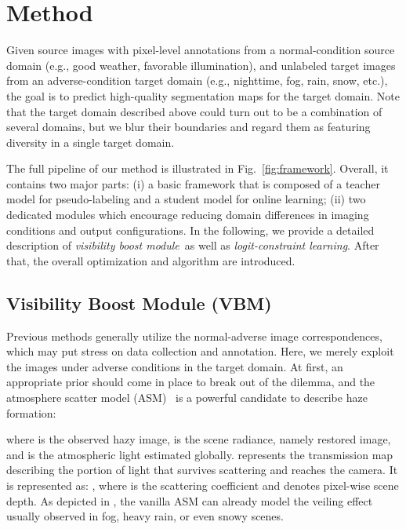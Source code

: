 \documentclass[letterpaper]{article} \usepackage{aaai23}  \usepackage{times}  \usepackage{helvet}  \usepackage{courier}  \usepackage[hyphens]{url}  \usepackage{graphicx} \urlstyle{rm} \def\UrlFont{\rm}  \usepackage{natbib}  \usepackage{caption} \frenchspacing  \setlength{\pdfpagewidth}{8.5in}  \setlength{\pdfpageheight}{11in}  \usepackage{algorithm}
\newcommand{\boostModuleNameTitle}{Visibility Boost Module (VBM)}
\newcommand{\boostModuleName}{\textit{visibility boost module}}
\newcommand{\lossModuleName}{\textit{logit-constraint learning}}
\begin{document}
\section{Method}\label{sec:method}

Given source images with pixel-level annotations from a normal-condition source domain  (e.g., good weather, favorable illumination), and unlabeled target images from an adverse-condition target domain  (e.g., nighttime, fog, rain, snow, etc.), the goal is to predict high-quality segmentation maps for the target domain. Note that the target domain described above could turn out to be a combination of several domains, but we blur their boundaries and regard them as featuring diversity in a single target domain.

The full pipeline of our method is illustrated in Fig.~\ref{fig:framework}. Overall, it contains two major parts: (i) a basic framework that is composed of a teacher model for pseudo-labeling and a student model for online learning; (ii) two dedicated modules which encourage reducing domain differences in imaging conditions and output configurations. In the following, we provide a detailed description of \boostModuleName~as well as \lossModuleName. After that, the overall optimization and algorithm are introduced. 



\subsection{\boostModuleNameTitle}
Previous methods generally utilize the normal-adverse image correspondences, which may put stress on data collection and annotation. Here, we merely exploit the images under adverse conditions in the target domain.
At first, an appropriate prior should come in place to break out of the dilemma, and the atmosphere scatter model (ASM)~\cite{nayar1999vision,narasimhan2003contrast} is a powerful candidate to describe haze formation:
\begin{small}
    
\end{small}where  is the observed hazy image,  is the scene radiance, namely restored image, and  is the atmospheric light estimated globally.  represents the transmission map describing the portion of light that survives scattering and reaches the camera. It is represented as: , where  is the scattering coefficient and  denotes pixel-wise scene depth. As depicted in \cite{li2019heavy}, the vanilla ASM can already model the veiling effect usually observed in fog, heavy rain, or even snowy scenes. 
\end{document}
